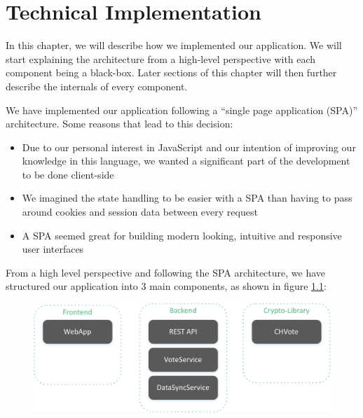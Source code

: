 \chapter{Technical Implementation}
In this chapter, we will describe how we implemented our application. We will start explaining the architecture from a high-level perspective with each component being a black-box. Later sections of this chapter will then further describe the internals of every component.

We have implemented our application following a "`single page application (SPA)"' architecture. Some reasons that lead to this decision:
\begin{itemize}
	\item Due to our personal interest in JavaScript and our intention of improving our knowledge in this language, we wanted a significant part of the development to be done client-side
	\item We imagined the state handling to be easier with a SPA than having to pass around cookies and session data between every request
	\item A SPA seemed great for building modern looking, intuitive and responsive user interfaces
\end{itemize}

From a high level perspective and following the SPA architecture, we have structured our application into 3 main components, as shown in figure \ref{System components}:

\begin{figure}[h!]
\begin{center}
\includegraphics[scale=0.95]{assets/componentdiagram.pdf}
\label{System components}
\end{center}
\end{figure}

